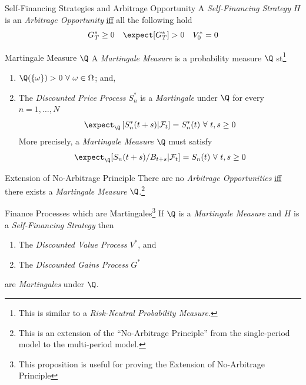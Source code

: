 \documentclass[11pt,a4paper]{article}
\begin{document}
  \begin{proposition}{Self-Financing Strategies and Arbitrage Opportunity}
    A \textit{Self-Financing Strategy} $H$ is an \textit{Arbitrage Opportunity} \underline{iff} all the following hold
    \[ G_T^*\geq0\quad\expect[G_T^*]>0\quad V_0^*=0 \]
  \end{proposition}

  \begin{definition}{Martingale Measure $\Q$}\label{def_martingale_measure}
    A \textit{Martingale Measure} is a probability measure $\Q$ st\footnote{This is similar to a \textit{Risk-Neutral Probability Measure}.}
    \begin{enumerate}
      \item $\Q(\{\omega\})>0\ \forall\ \omega\in\Omega$; and,
      \item The \textit{Discounted Price Process} $S_n^*$ is a \textit{Martingale} under $\Q$ for every $n=1,\dots,N$
      \[ \expect_\Q\left[S_n^*(t+s)|\mathcal{F}_t\right]=S_n^*(t)\ \forall\ t,s\geq0 \]
      More precisely, a \textit{Martingale Measure} $\Q$ must satisfy
      \[ \expect_\Q[S_n(t+s)/B_{t+s}|\mathcal{F}_t]=S_n(t)\ \forall\ t,s\geq0 \]
    \end{enumerate}
  \end{definition}

  \begin{theorem}{Extension of No-Arbitrage Principle}\label{the_extension_of_no_arbitrage_principle}
    There are no \textit{Arbitrage Opportunities} \underline{iff} there exists a \textit{Martingale Measure} $\Q$.\footnote{This is an extension of the ``No-Arbitrage Principle'' from the single-period model to the multi-period model.}
  \end{theorem}

  \begin{proposition}{Finance Processes which are Martingales\footnote{This proposition is useful for proving the Extension of No-Arbitrage Principle}}\label{prop_finance_processes_which_are_martingales}
    If $\Q$ is a \textit{Martingale Measure} and $H$ is a \textit{Self-Financing Strategy} then
    \begin{enumerate}
      \item The \textit{Discounted Value Process} $V^*$, and
      \item The \textit{Discounted Gains Process} $G^*$
    \end{enumerate}
    are \textit{Martingales} under $\Q$.
  \end{proposition}
\end{document}
